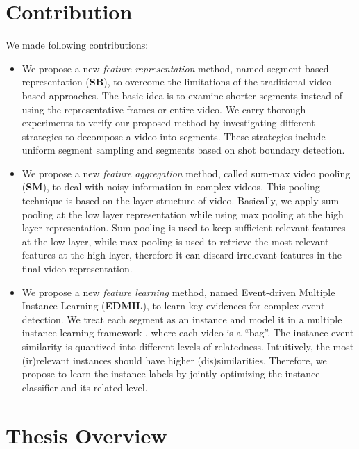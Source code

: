 \section{Contribution}

We made following contributions:

\begin{itemize}
\item We propose a new \textit{feature representation} method, named segment-based representation (\textbf{SB}), to overcome the limitations of the traditional video-based approaches. The basic idea is to examine shorter segments instead of using the representative frames or entire video. We carry thorough experiments to verify our proposed method by investigating different strategies to decompose a video into segments. These strategies include uniform segment sampling and segments based on shot boundary detection.

\item We propose a new \textit{feature aggregation} method, called sum-max video pooling (\textbf{SM}), to deal with noisy information in complex videos. This pooling technique is based on the layer structure of video. Basically, we apply sum pooling at the low layer representation while using max pooling at the high layer representation. Sum pooling is used to keep sufficient relevant features at the low layer, while max pooling is used to retrieve the most relevant features at the high layer, therefore it can discard irrelevant features in the final video representation. 
	
\item We propose a new \textit{feature learning} method, named Event-driven Multiple Instance Learning (\textbf{EDMIL}), to learn key evidences for complex event detection. We treat each segment as an instance and model it in a multiple instance learning framework \cite{andrews2002support}, where each video is a ``bag''. The instance-event similarity is quantized into different levels of relatedness. Intuitively, the most (ir)relevant instances should have higher (dis)similarities. Therefore, we propose to learn the instance labels by jointly optimizing the instance classifier and its related level.
	
\end{itemize}

\section{Thesis Overview}

